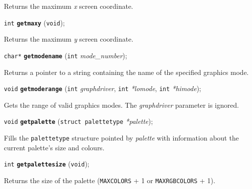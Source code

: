 \documentclass[a4paper,12pt]{article}
\newcommand{\V}{\texttt{void}}      %
\newcommand{\I}{\texttt{int}}       %
\newcommand{\func}[1]{\textbf{\texttt{#1}}}  %
\newcommand{\A}[1]{\emph{#1}}       %
\newcommand{\T}[1]{\texttt{#1}}     %
\newenvironment{bgi}
{ %
  \begin{snugshade}
}
{ %
  \end{snugshade}
}
\begin{document}
Returns the maximum \A{x} screen coordinate.


\label{sec:getmaxy}

\begin{bgi}
\I{} \func{getmaxy} (\V{});
\end{bgi}

Returns the maximum \A{y} screen coordinate.


\label{sec:getmodename}

\begin{bgi}
\texttt{char*} \func{getmodename} (\I{} \A{mode\_number});
\end{bgi}

Returns a pointer to a string containing the name of the specified
graphics mode.


\label{sec:getmoderange}

\begin{bgi}
\V{} \func{getmoderange} (\I{} \A{graphdriver}, \I{} \A{*lomode}, \I{}
\A{*himode});
\end{bgi}

Gets the range of valid graphics modes. The \A{graphdriver} parameter
is ignored.


\label{sec:getpalette}

\begin{bgi}
\V{} \func{getpalette} (\texttt{struct palettetype} \A{*palette});
\end{bgi}

Fills the \texttt{palettetype} structure pointed by \A{palette} with
information about the current palette's size and colours.


\label{sec:getpalettesize}

\begin{bgi}
\I{} \func{getpalettesize} (\V{});
\end{bgi}

Returns the size of the palette (\T{MAXCOLORS} + 1 or
\T{MAXRGB\-COLORS} + 1).
\end{document}
